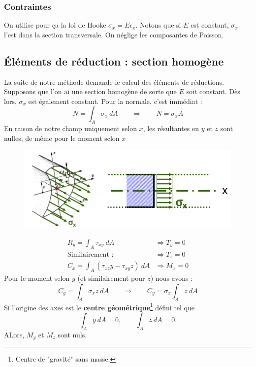 		\subsubsection{Contraintes}
		On utilise pour ça la loi de Hooke $ \sigma_x = E\epsilon_x$. Notons 
		que si $E$ est constant, $\sigma_x$ l'est dans la section transversale.
		On néglige les composantes de Poisson.
		
	\subsection{Éléments de réduction : section homogène}
	La suite de notre méthode demande le calcul des éléments de réductions. 
	Supposons que l'on ai une section homogène de sorte que $E$ soit constant. 
	Dès lors, $\sigma_x$ est également constant. Pour la normale, c'est immédiat :
	\begin{equation}
	N = \int_A \sigma_x\ dA \qquad\Longrightarrow\qquad N = \sigma_xA
	\end{equation}
	En raison de notre champ uniquement selon $x$, les résultantes en $y$ et $z$ 
	sont nulles, de même pour le moment selon $x$\\
		\begin{figure}
	\vspace{-5mm}
	\includegraphics[scale=0.45]{ch3/image2.png}
	\end{figure}
	\begin{equation}
	\begin{array}{ll}
	R_y = \int_A \tau_{xy}\ dA &\Longrightarrow T_y = 0\\
	\text{Similairement : }&\Longrightarrow T_z = 0\\
	C_x = \int_A (\tau_{xz}y-\tau_{xy}z)\ dA &\Longrightarrow M_x = 0
	\end{array}
	\end{equation}
	Pour le moment selon $y$ (et similairement pour $z$) nous avons :
	\begin{equation}
	C_y = \int_A \sigma_xz\ dA\qquad\Longrightarrow\qquad C_y =  \sigma_x
	\int_A z\ dA
	\end{equation}
	Si l'origine des axes est le \textbf{centre géométrique}\footnote{Centre 
	de "gravité" sans masse.} défini tel que 
	\begin{equation}
	\int_A y\ dA = 0,\qquad \int_A z\ dA = 0.
	\end{equation}
	ALors, $M_y$ et $M_z$ sont nuls.
	

